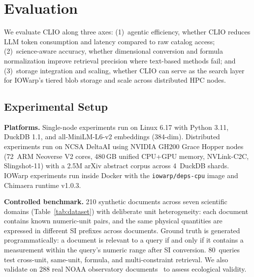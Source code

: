 \section{Evaluation}
\label{sec:evaluation}

We evaluate CLIO along three axes: (1)~agentic efficiency, whether CLIO
reduces LLM token consumption and latency compared to raw catalog access;
(2)~science-aware accuracy, whether dimensional conversion and formula
normalization improve retrieval precision where text-based methods fail;
and (3)~storage integration and scaling, whether CLIO can serve as the
search layer for IOWarp's tiered blob storage and scale across
distributed HPC nodes.

\subsection{Experimental Setup}
\label{sec:setup}

\textbf{Platforms.} Single-node experiments run on Linux 6.17 with
Python 3.11, DuckDB 1.1, and all-MiniLM-L6-v2 embeddings (384-dim).
Distributed experiments run on NCSA DeltaAI using NVIDIA GH200 Grace
Hopper nodes (72~ARM Neoverse V2 cores, 480\,GB unified CPU+GPU
memory, NVLink-C2C, Slingshot-11) with a 2.5M arXiv abstract corpus
across 4~DuckDB shards. IOWarp experiments run inside Docker with the
\texttt{iowarp/deps-cpu} image and Chimaera runtime v1.0.3.

\textbf{Controlled benchmark.} 210 synthetic documents across seven
scientific domains (Table~\ref{tab:dataset}) with deliberate unit
heterogeneity: each document contains known numeric-unit pairs, and
the same physical quantities are expressed in different SI prefixes
across documents. Ground truth is generated programmatically: a
document is relevant to a query if and only if it contains a
measurement within the query's numeric range after SI conversion.
80~queries test cross-unit, same-unit, formula, and multi-constraint
retrieval. We also validate on 288 real NOAA observatory
documents~\cite{ghcn2012} to assess ecological validity.

